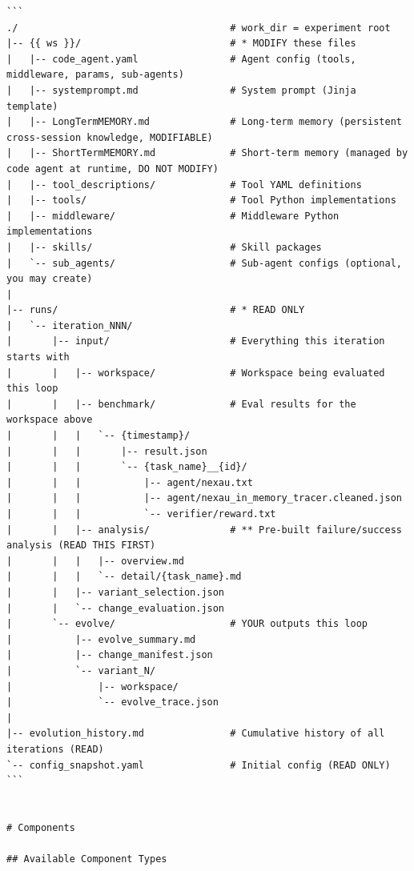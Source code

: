 \begin{tcolorbox}
\begin{lstlisting}
```
./                                     # work_dir = experiment root
|-- {{ ws }}/                          # * MODIFY these files
|   |-- code_agent.yaml                # Agent config (tools, middleware, params, sub-agents)
|   |-- systemprompt.md                # System prompt (Jinja template)
|   |-- LongTermMEMORY.md              # Long-term memory (persistent cross-session knowledge, MODIFIABLE)
|   |-- ShortTermMEMORY.md             # Short-term memory (managed by code agent at runtime, DO NOT MODIFY)
|   |-- tool_descriptions/             # Tool YAML definitions
|   |-- tools/                         # Tool Python implementations
|   |-- middleware/                    # Middleware Python implementations
|   |-- skills/                        # Skill packages
|   `-- sub_agents/                    # Sub-agent configs (optional, you may create)
|
|-- runs/                              # * READ ONLY
|   `-- iteration_NNN/
|       |-- input/                     # Everything this iteration starts with
|       |   |-- workspace/             # Workspace being evaluated this loop
|       |   |-- benchmark/             # Eval results for the workspace above
|       |   |   `-- {timestamp}/
|       |   |       |-- result.json
|       |   |       `-- {task_name}__{id}/
|       |   |           |-- agent/nexau.txt
|       |   |           |-- agent/nexau_in_memory_tracer.cleaned.json
|       |   |           `-- verifier/reward.txt
|       |   |-- analysis/              # ** Pre-built failure/success analysis (READ THIS FIRST)
|       |   |   |-- overview.md
|       |   |   `-- detail/{task_name}.md
|       |   |-- variant_selection.json
|       |   `-- change_evaluation.json
|       `-- evolve/                    # YOUR outputs this loop
|           |-- evolve_summary.md
|           |-- change_manifest.json
|           `-- variant_N/
|               |-- workspace/
|               `-- evolve_trace.json
|
|-- evolution_history.md               # Cumulative history of all iterations (READ)
`-- config_snapshot.yaml               # Initial config (READ ONLY)
```


# Components

## Available Component Types


\end{lstlisting}
\end{tcolorbox}
